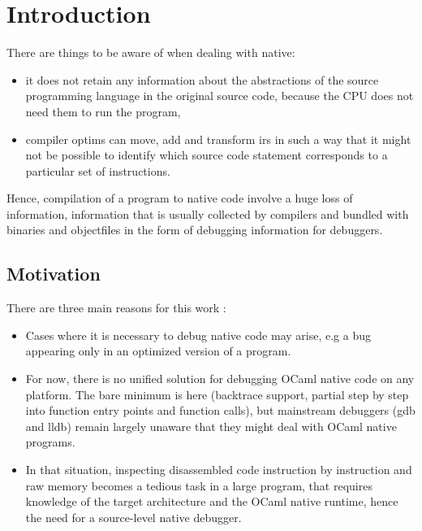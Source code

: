 \chapter{Introduction\label{cha:chapter1}}

There are things to be aware of when dealing with \gls{native}:
\begin{itemize}
    \item it does not retain any information about
        the abstractions of the source programming language in the original
        source code, because the CPU does not need them to run the program,
    \item compiler \glspl{optim} can move, add and transform \glspl{ir}
        in such a way that it might not be possible to identify which
        source code statement corresponds to a particular set of instructions.
\end{itemize}

Hence, compilation of a program to native code involve a huge loss of information,
information that is usually collected by compilers and bundled with binaries and
\glspl{objectfile} in the form of debugging information for debuggers.

\section{Motivation\label{sec:moti}}

There are three main reasons for this work :

\begin{itemize}
    \item Cases where it is necessary to debug native code may arise, e.g a bug
        appearing only in an optimized version of a program.
    \item For now, there is no unified solution for debugging OCaml native
        code on any platform. The bare minimum is here (\gls{backtrace} support,
        partial step by step into function entry points and function calls),
        but mainstream debuggers (gdb and lldb) remain largely unaware that they
        might deal with OCaml native programs.
    \item In that situation, inspecting disassembled code instruction by
        instruction and raw memory becomes a tedious task in a large program,
        that requires knowledge of the target architecture and the OCaml native
        runtime, hence the need for a source-level native debugger.
\end{itemize}

